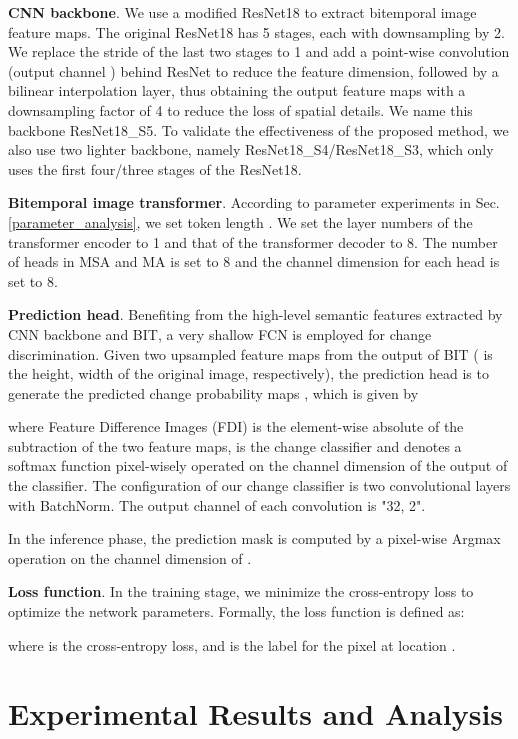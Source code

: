 \documentclass[journal]{IEEEtran}
\begin{document}
\textbf{CNN backbone}. We use a modified ResNet18 \cite{He2016} to extract bitemporal image feature maps. The original ResNet18 has 5 stages, each with downsampling by 2. We replace the stride of the last two stages to 1 and add a point-wise convolution (output channel ) behind ResNet to reduce the feature dimension, followed by a bilinear interpolation layer, thus obtaining the output feature maps with a downsampling factor of 4 to reduce the loss of spatial details. We name this backbone ResNet18\_S5. To validate the effectiveness of the proposed method, we also use two lighter backbone, namely ResNet18\_S4/ResNet18\_S3, which only uses the first four/three stages of the ResNet18. 

\textbf{Bitemporal image transformer}. According to parameter experiments in Sec. \ref{parameter_analysis}, we set token length . We set the layer numbers of the transformer encoder to 1 and that of the transformer decoder to 8. The number of heads  in MSA and MA is set to 8 and the channel dimension  for each head is set to 8.


\textbf{Prediction head}. Benefiting from the high-level semantic features extracted by CNN backbone and BIT, a very shallow FCN is employed for change discrimination. Given two upsampled feature maps  from the output of BIT ( is the height, width of the original image, respectively), the prediction head is to generate the predicted change probability maps , which is given by 

where Feature Difference Images (FDI)  is the element-wise absolute of the subtraction of the two feature maps,  is the change classifier and  denotes a softmax function pixel-wisely operated on the channel dimension of the output of the classifier. The configuration of our change classifier is two  convolutional layers with BatchNorm. The output channel of each convolution is "32, 2".

In the inference phase, the prediction mask  is computed by a pixel-wise Argmax operation on the channel dimension of .

\textbf{Loss function}. In the training stage, we minimize the cross-entropy loss to optimize the network parameters. Formally, the loss function is defined as:

where  is the cross-entropy loss, and  is the label for the pixel at location .


\section{Experimental Results and Analysis} \label{sec:experiment}
\end{document}
